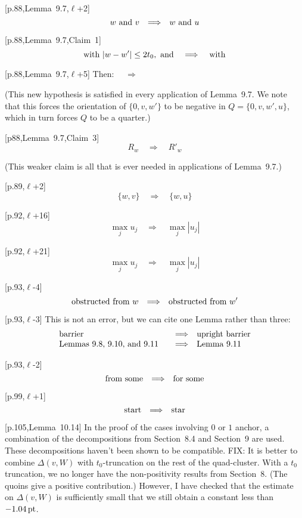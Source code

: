 \documentclass[11pt]{amsart}
\def\op#1{{\text{#1}}}
\def\to{{\quad\Longrightarrow\quad}}
\def\line{$\ell$}
\def\text{\hbox}
\begin{document}
[p.88,Lemma~9.7,\line+2] 
	$$
	w\text{ and } v\to w \text{ and } u
	$$
	
[p.88,Lemma~9.7,Claim~1]
	$$
	\text{ with } |w - w'|\le 2t_0, \text{ and }
	\to \text{ with }
	$$
	
[p.88,Lemma~9.7,\line+5]
         Then: $\to$



(This new hypothesis is satisfied
        in every application of Lemma~9.7.
        We note that this forces the orientation of $\{0,v,w'\}$ to
        be negative in $Q=\{0,v,w',u\}$, which in turn forces $Q$
        to be a quarter.)

[p88,Lemma~9.7,Claim~3]
        $$
        R_w \to R'_w
        $$

        (This weaker claim is all that is ever needed in applications
        of Lemma~9.7.)

[p.89,\line+2]
	$$
	\{w,v\}\to\{w,u\}
	$$

[p.92,\line+16]
        $$
        \max_j u_j \to \max_j |u_j|
        $$

[p.92,\line+21]
        $$
        \max_j u_j \to \max_j |u_j|
        $$
	
[p.93,\line-4]
	$$
	\text{obstructed from }w \to
	\text{obstructed from }w'
	$$
	
	
[p.93,\line-3] This is not an error, but we
	can cite one Lemma rather than three:
		$$
		\begin{array}{lll}
		\text{barrier} &\to \text{upright barrier}\\
		\text{Lemmas~9.8, 9.10, and 9.11} &\to
		\text{Lemma~9.11}
		\end{array}
		$$
		
[p.93,\line-2]
	$$
	\text{from some} \to \text{for some}
	$$

[p.99,\line+1]
        $$
        \text{start} \to \text{star}
        $$

[p.105,Lemma~10.14]  In the proof of the cases involving
   $0$ or $1$ anchor, a combination of the decompositions from
   Section~8.4 and Section~9 are used.  These decompositions haven't
   been shown to be compatible.  
   FIX: It is better to combine
   $\Delta(v,W)$ with $t_0$-truncation on the rest of the quad-cluster.
   With a $t_0$ truncation, we no longer have the non-positivity results
   from Section~8.  (The quoins give a positive contribution.) However,
   I have checked that
   the estimate on $\Delta(v,W)$ is sufficiently small that we still
   obtain a constant less than $-1.04\,\op{pt}$.
   
\end{document}
